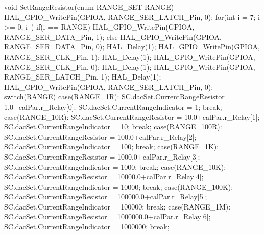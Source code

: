 void SetRangeResistor(enum RANGE_SET RANGE) {
	HAL_GPIO_WritePin(GPIOA, RANGE_SER_LATCH_Pin, 0);
	for(int i = 7; i >= 0; i--) {
		if(i == RANGE) {
			HAL_GPIO_WritePin(GPIOA, RANGE_SER_DATA_Pin, 1);
		}
		else {
			HAL_GPIO_WritePin(GPIOA, RANGE_SER_DATA_Pin, 0);
		}
			HAL_Delay(1);
			HAL_GPIO_WritePin(GPIOA, RANGE_SER_CLK_Pin, 1);
			HAL_Delay(1);
			HAL_GPIO_WritePin(GPIOA, RANGE_SER_CLK_Pin, 0);
			HAL_Delay(1);
	}
	HAL_GPIO_WritePin(GPIOA, RANGE_SER_LATCH_Pin, 1);
	HAL_Delay(1);
	HAL_GPIO_WritePin(GPIOA, RANGE_SER_LATCH_Pin, 0);
	switch(RANGE){
	case(RANGE_1R):
			SC.dacSet.CurrentRangeResistor = 1.0+calPar.r_Relay[0];
			SC.dacSet.CurrentRangeIndicator = 1;
			break;
	case(RANGE_10R):
		SC.dacSet.CurrentRangeResistor = 10.0+calPar.r_Relay[1];
		SC.dacSet.CurrentRangeIndicator = 10;
			break;
	case(RANGE_100R):
		SC.dacSet.CurrentRangeResistor = 100.0+calPar.r_Relay[2];
		SC.dacSet.CurrentRangeIndicator = 100;
		break;
	case(RANGE_1K):
		SC.dacSet.CurrentRangeResistor = 1000.0+calPar.r_Relay[3];
		SC.dacSet.CurrentRangeIndicator = 1000;
			break;
	case(RANGE_10K):
		SC.dacSet.CurrentRangeResistor = 10000.0+calPar.r_Relay[4];
		SC.dacSet.CurrentRangeIndicator = 10000;
		break;
	case(RANGE_100K):
		SC.dacSet.CurrentRangeResistor = 100000.0+calPar.r_Relay[5];
		SC.dacSet.CurrentRangeIndicator = 100000;
		break;
	case(RANGE_1M):
		SC.dacSet.CurrentRangeResistor = 1000000.0+calPar.r_Relay[6];
		SC.dacSet.CurrentRangeIndicator = 1000000;
		break;
	}
}

